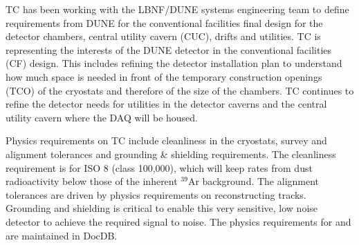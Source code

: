 TC has been working with the LBNF/DUNE systems engineering team to
define requirements from DUNE for the conventional facilities final
design for the detector chambers, central utility cavern (CUC), drifts
and utilities. TC is representing the interests of the DUNE detector
in the conventional facilities (CF) design. This includes refining the
detector installation plan to understand how much space is needed in
front of the temporary construction openings (TCO) of the cryostats
and therefore of the size of the chambers. TC continues to refine the
detector needs for utilities in the detector caverns and the central
utility cavern where the DAQ will be housed.

Physics requirements on TC include cleanliness in the cryostats,
survey and alignment tolerances and grounding \& shielding
requirements. The cleanliness requirement is for ISO 8 (class
100,000), which will keep rates from dust radioactivity below those of
the inherent $^{39}$Ar background. The alignment tolerances are driven
by physics requirements on reconstructing tracks. Grounding and
shielding is critical to enable this very sensitive, low noise
detector to achieve the required signal to noise. The physics
requirements for  and  are maintained in
DocDB.







